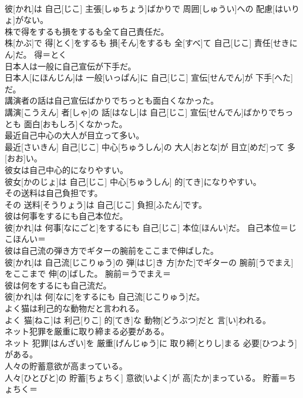 \documentclass[8pt]{extreport}
\begin{document}
\begin{CJK}{UTF8}{min}
{\\	彼[かれ]は 自己[じこ] 主張[しゅちょう]ばかりで 周囲[しゅうい]への 配慮[はいりょ]がない。	
\\	株で得をするも損をするも全て自己責任だ。	
\\	株[かぶ]で 得[とく]をするも 損[そん]をするも 全[すべ]て 自己[じこ] 責任[せきにん]だ。	得＝とく
\\	日本人は一般に自己宣伝が下手だ。	
\\	日本人[にほんじん]は 一般[いっぱん]に 自己[じこ] 宣伝[せんでん]が 下手[へた]だ。	
\\	講演者の話は自己宣伝ばかりでちっとも面白くなかった。	
\\	講演[こうえん] 者[しゃ]の 話[はなし]は 自己[じこ] 宣伝[せんでん]ばかりでちっとも 面白[おもしろ]くなかった。	
\\	最近自己中心の大人が目立って多い。	
\\	最近[さいきん] 自己[じこ] 中心[ちゅうしん]の 大人[おとな]が 目立[めだ]って 多[おお]い。	
\\	彼女は自己中心的になりやすい。	
\\	彼女[かのじょ]は 自己[じこ] 中心[ちゅうしん] 的[てき]になりやすい。	
\\	その送料は自己負担です。	
\\	その 送料[そうりょう]は 自己[じこ] 負担[ふたん]です。	
\\	彼は何事をするにも自己本位だ。	
\\	彼[かれ]は 何事[なにごと]をするにも 自己[じこ] 本位[ほんい]だ。	自己本位＝じこほんい＝ 
\\	彼は自己流の弾き方でギターの腕前をここまで伸ばした。	
\\	彼[かれ]は 自己流[じこりゅう]の 弾[はじ]き 方[かた]でギターの 腕前[うでまえ]をここまで 伸[の]ばした。	腕前＝うでまえ＝ 
\\	彼は何をするにも自己流だ。	
\\	彼[かれ]は 何[なに]をするにも 自己流[じこりゅう]だ。	
\\	よく猫は利己的な動物だと言われる。	
\\	よく 猫[ねこ]は 利己[りこ] 的[てき]な 動物[どうぶつ]だと 言[い]われる。	
\\	ネット犯罪を厳重に取り締まる必要がある。	
\\	ネット 犯罪[はんざい]を 厳重[げんじゅう]に 取り締[とりし]まる 必要[ひつよう]がある。	
\\	人々の貯蓄意欲が高まっている。	
\\	人々[ひとびと]の 貯蓄[ちょちく] 意欲[いよく]が 高[たか]まっている。	貯蓄＝ちょちく＝ 
}
\end{CJK}
\end{document}
